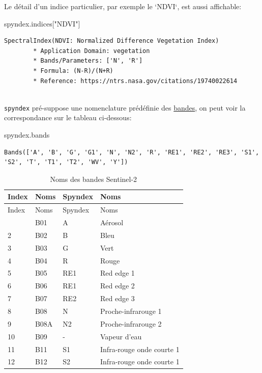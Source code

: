 \documentclass[
]{article}
\newenvironment{Shaded}{}{}
\newcommand{\NormalTok}[1]{#1}
\newcommand{\StringTok}[1]{\textcolor[rgb]{0.25,0.44,0.63}{#1}}
\begin{document}
Le détail d'un indice particulier, par exemple le `NDVI`, est aussi
affichable:

\label{aeaea7e3}
\label{cb7}
\begin{Shaded}
\begin{Highlighting}[]
\NormalTok{spyndex.indices[}\StringTok{"NDVI"}\NormalTok{]}
\end{Highlighting}
\end{Shaded}

\begin{verbatim}
SpectralIndex(NDVI: Normalized Difference Vegetation Index)
        * Application Domain: vegetation
        * Bands/Parameters: ['N', 'R']
        * Formula: (N-R)/(N+R)
        * Reference: https://ntrs.nasa.gov/citations/19740022614
        
\end{verbatim}

\texttt{spyndex} pré-suppose une nomenclature prédéfinie des
\href{https://awesome-ee-spectral-indices.readthedocs.io/en/latest/\#expressions}{bandes},
on peut voir la correspondance sur le tableau ci-dessous:

\label{6adfad8e}
\label{cb9}
\begin{Shaded}
\begin{Highlighting}[]
\NormalTok{spyndex.bands}
\end{Highlighting}
\end{Shaded}

\begin{verbatim}
Bands(['A', 'B', 'G', 'G1', 'N', 'N2', 'R', 'RE1', 'RE2', 'RE3', 'S1', 'S2', 'T', 'T1', 'T2', 'WV', 'Y'])
\end{verbatim}

\begin{longtable}[]{@{}llll@{}}
\caption{Noms des bandes Sentinel-2}\tabularnewline
\toprule\noalign{}
Index & Noms & Spyndex & Noms \\
\midrule\noalign{}
\endfirsthead
\toprule\noalign{}
Index & Noms & Spyndex & Noms \\
\midrule\noalign{}
\endhead
\bottomrule\noalign{}
\endlastfoot
1 & B01 & A & Aérosol \\
2 & B02 & B & Bleu \\
3 & B03 & G & Vert \\
4 & B04 & R & Rouge \\
5 & B05 & RE1 & Red edge 1 \\
6 & B06 & RE1 & Red edge 2 \\
7 & B07 & RE2 & Red edge 3 \\
8 & B08 & N & Proche-infrarouge 1 \\
9 & B08A & N2 & Proche-infrarouge 2 \\
10 & B09 & - & Vapeur d'eau \\
11 & B11 & S1 & Infra-rouge onde courte 1 \\
12 & B12 & S2 & Infra-rouge onde courte 1 \\
\end{longtable}
\end{document}
